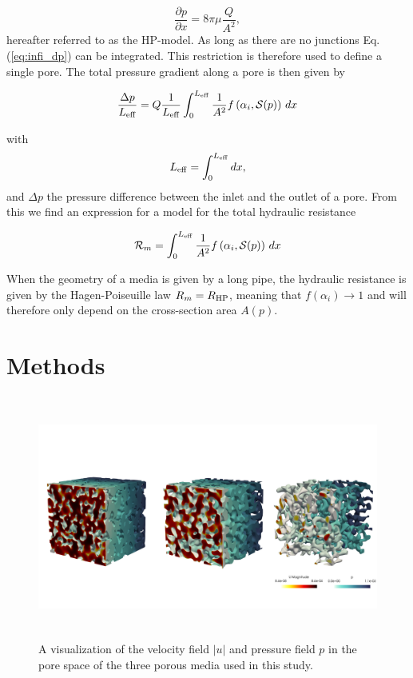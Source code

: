 \documentclass[draft]{agujournal2019}
\begin{document}
\begin{equation}
	\frac{\partial p}{\partial x} = 8 \pi \mu\frac{Q}{A^2}, \label{eq:HP}
\end{equation}
hereafter referred to as the HP-model. As long as there are no junctions Eq.(\ref{eq:infi_dp}) can be integrated. This restriction is therefore used to define a single pore. The total pressure gradient along a pore is then given by

\begin{equation}
	\frac{\Delta p}{L_{\rm{eff}}} =  Q \frac{1}{L_{\rm{eff}}}\int^{L_{\rm{eff}}}_{0}\frac{1}{A^2}f\left(\alpha_i,\mathcal{S}(p)\right)\,dx
\end{equation}

with 
\begin{equation}
	L_{\rm{eff}} = \int^{L_{\rm{eff}}}_{0} dx,
\end{equation}
and $\Delta p$ the pressure difference between the inlet and the outlet of a pore. From this we find an expression for a model for the total hydraulic resistance 

\begin{equation}
	\mathcal{R}_m = \int^{L_{\rm{eff}}}_{0}\frac{1}{A^2}f\left(\alpha_i,\mathcal{S}(p)\right)\,dx\label{eq:R_model}
\end{equation}

When the geometry of a media is given by a long pipe, the hydraulic resistance is given by the Hagen-Poiseuille law $R_m = R_{\rm{HP}}$, meaning that $f(\alpha_i)\rightarrow 1$ and will therefore only depend on the cross-section area  $A(p)$.



\section{Methods}
\begin{figure}[t!]
\includegraphics[height=8cm]{figures/PM_combined_surfaces_DNS.png}
\caption{A visualization of the velocity field $|u|$ and pressure field $p$ in the pore space of the three porous media used in this study.}
\label{fig:DNS}
\end{figure}
\end{document}
